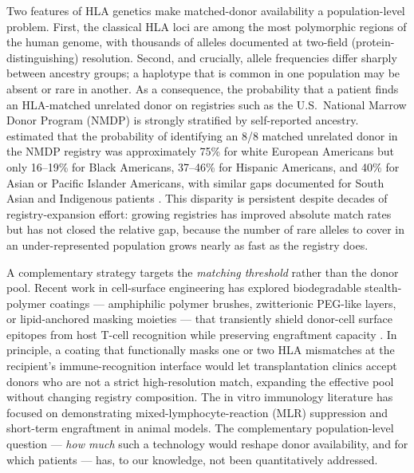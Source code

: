 \documentclass[11pt]{article}
\begin{document}
Two features of HLA genetics make matched-donor availability a population-level problem. First, the classical HLA loci are among the most polymorphic regions of the human genome, with thousands of alleles documented at two-field (protein-distinguishing) resolution. Second, and crucially, allele frequencies differ sharply between ancestry groups; a haplotype that is common in one population may be absent or rare in another. As a consequence, the probability that a patient finds an HLA-matched unrelated donor on registries such as the U.S.\ National Marrow Donor Program (NMDP) is strongly stratified by self-reported ancestry. \citet{gragert2014hla} estimated that the probability of identifying an 8/8 matched unrelated donor in the NMDP registry was approximately 75\% for white European Americans but only 16--19\% for Black Americans, 37--46\% for Hispanic Americans, and 40\% for Asian or Pacific Islander Americans, with similar gaps documented for South Asian and Indigenous patients \citep{barker2019cord}. This disparity is persistent despite decades of registry-expansion effort: growing registries has improved absolute match rates but has not closed the relative gap, because the number of rare alleles to cover in an under-represented population grows nearly as fast as the registry does.

A complementary strategy targets the \emph{matching threshold} rather than the donor pool. Recent work in cell-surface engineering has explored biodegradable stealth-polymer coatings --- amphiphilic polymer brushes, zwitterionic PEG-like layers, or lipid-anchored masking moieties --- that transiently shield donor-cell surface epitopes from host T-cell recognition while preserving engraftment capacity \citep{teramura2010polymer,cabric2007islet}. In principle, a coating that functionally masks one or two HLA mismatches at the recipient's immune-recognition interface would let transplantation clinics accept donors who are not a strict high-resolution match, expanding the effective pool without changing registry composition. The in vitro immunology literature has focused on demonstrating mixed-lymphocyte-reaction (MLR) suppression and short-term engraftment in animal models. The complementary population-level question --- \emph{how much} such a technology would reshape donor availability, and for which patients --- has, to our knowledge, not been quantitatively addressed.
\end{document}
